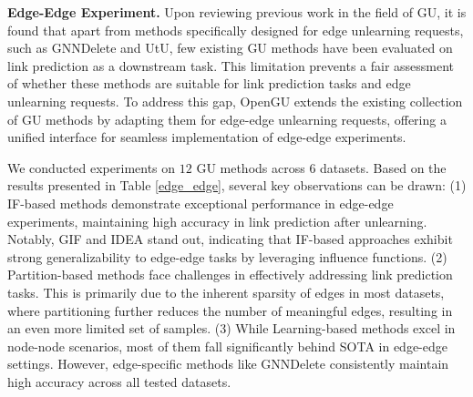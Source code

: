 \textbf{Edge-Edge Experiment.}
Upon reviewing previous work in the field of GU, it is found that apart from methods specifically designed for edge unlearning requests, such as GNNDelete and UtU, few existing GU methods have been evaluated on link prediction as a downstream task. This limitation prevents a fair assessment of whether these methods are suitable for link prediction tasks and edge unlearning requests. To address this gap, OpenGU extends the existing collection of GU methods by adapting them for edge-edge unlearning requests, offering a unified interface for seamless implementation of edge-edge experiments. 


We conducted experiments on $12$ GU methods across $6$ datasets. Based on the results presented in Table \ref{edge_edge}, several key observations can be drawn: (1) IF-based methods demonstrate exceptional performance in edge-edge experiments, maintaining high accuracy in link prediction after unlearning. Notably, GIF and IDEA stand out, indicating that IF-based approaches exhibit strong generalizability to edge-edge tasks by leveraging influence functions. (2) Partition-based methods face challenges in effectively addressing link prediction tasks. This is primarily due to the inherent sparsity of edges in most datasets, where partitioning further reduces the number of meaningful edges, resulting in an even more limited set of samples. 
(3) While Learning-based methods excel in node-node scenarios, most of them fall significantly behind SOTA in edge-edge settings. However, edge-specific methods like GNNDelete consistently maintain high accuracy across all tested datasets. 


